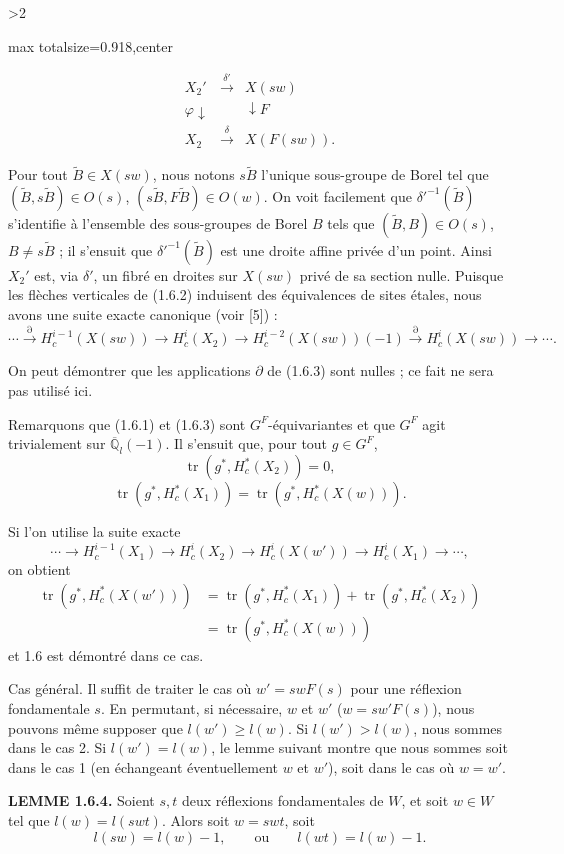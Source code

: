 \documentclass[9pt,twoside]{extarticle}
\newcommand{\EditionPage}[3]{%
  \ifnum#1>2\clearpage\fi
  \pdfbookmark[1]{Printed page #2}{fr-folio-#2}%
  \hypertarget{fr-physical-#1}{}%
  \noindent\begin{adjustbox}{max totalsize={\textwidth}{0.918\textheight},center}
  \begin{minipage}[t]{\textwidth}
  \fontsize{9.4}{11.1}\selectfont\justifying
  #3
  \end{minipage}
  \end{adjustbox}%
}
\begin{document}
\EditionPage{8}{109}{%
\[
\tag{1.6.2}
\begin{array}{ccc}
X_2' & \xrightarrow{\delta'} & X(sw)\\
{\scriptstyle\varphi}\downarrow & & \downarrow{\scriptstyle F}\\
X_2 & \xrightarrow{\delta} & X(F(sw)).
\end{array}
\]

Pour tout \(\widetilde B\in X(sw)\), nous notons \(s\widetilde B\) l'unique sous-groupe de Borel tel que \((\widetilde B,s\widetilde B)\in O(s)\), \((s\widetilde B,F\widetilde B)\in O(w)\). On voit facilement que \(\delta'^{-1}(\widetilde B)\) s'identifie à l'ensemble des sous-groupes de Borel \(B\) tels que \((\widetilde B,B)\in O(s)\), \(B\ne s\widetilde B\) ; il s'ensuit que \(\delta'^{-1}(\widetilde B)\) est une droite affine privée d'un point. Ainsi \(X_2'\) est, via \(\delta'\), un fibré en droites sur \(X(sw)\) privé de sa section nulle. Puisque les flèches verticales de (1.6.2) induisent des équivalences de sites étales, nous avons une suite exacte canonique (voir [5]) : \[
\tag{1.6.3}
\cdots\xrightarrow{\partial}H_c^{i-1}(X(sw))\longrightarrow H_c^i(X_2)\longrightarrow H_c^{i-2}(X(sw))(-1)
\xrightarrow{\partial}H_c^i(X(sw))\longrightarrow\cdots.
\]\par

On peut démontrer que les applications \(\partial\) de (1.6.3) sont nulles ; ce fait ne sera pas utilisé ici.\par

Remarquons que (1.6.1) et (1.6.3) sont \(G^F\)-équivariantes et que \(G^F\) agit trivialement sur \(\overline{\mathbb{Q}}_l(-1)\). Il s'ensuit que, pour tout \(g\in G^F\), \[
\operatorname{tr}(g^*,H_c^*(X_2))=0,
\]  \[
\operatorname{tr}(g^*,H_c^*(X_1))=\operatorname{tr}(g^*,H_c^*(X(w))).
\]\par

Si l'on utilise la suite exacte \[
\cdots\longrightarrow H_c^{i-1}(X_1)\longrightarrow H_c^i(X_2)\longrightarrow H_c^i(X(w'))\longrightarrow H_c^i(X_1)\longrightarrow\cdots,
\] on obtient \[
\begin{aligned}
\operatorname{tr}(g^*,H_c^*(X(w')))
&=\operatorname{tr}(g^*,H_c^*(X_1))+\operatorname{tr}(g^*,H_c^*(X_2))\\
&=\operatorname{tr}(g^*,H_c^*(X(w)))
\end{aligned}
\] et 1.6 est démontré dans ce cas.\par

Cas général. Il suffit de traiter le cas où \(w'=swF(s)\) pour une réflexion fondamentale \(s\). En permutant, si nécessaire, \(w\) et \(w'\) (\(w=sw'F(s)\)), nous pouvons même supposer que \(l(w')\ge l(w)\). Si \(l(w')>l(w)\), nous sommes dans le cas 2. Si \(l(w')=l(w)\), le lemme suivant montre que nous sommes soit dans le cas 1 (en échangeant éventuellement \(w\) et \(w'\)), soit dans le cas où \(w=w'\).\par

\noindent\textbf{LEMME 1.6.4.} Soient \(s,t\) deux réflexions fondamentales de \(W\), et soit \(w\in W\) tel que \(l(w)=l(swt)\). Alors soit \(w=swt\), soit \[
l(sw)=l(w)-1,\qquad\text{ou}\qquad l(wt)=l(w)-1.
\]\par
}
\end{document}
